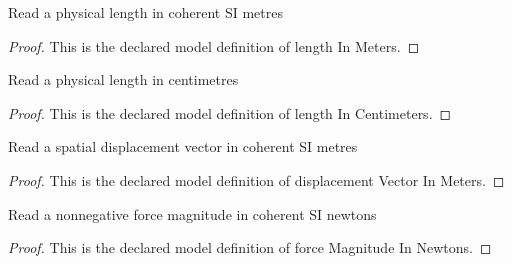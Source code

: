 \begin{definition}
  \label{def:physics:phyx-mini-0701:phyxminiproblems-problemphyxmini0701-lengthinmeters}
  Read a physical length in coherent SI metres
\end{definition}
\begin{proof}
  This is the declared model definition of length In Meters.
\end{proof}
\begin{definition}
  \label{def:physics:phyx-mini-0701:phyxminiproblems-problemphyxmini0701-lengthincentimeters}
  Read a physical length in centimetres
\end{definition}
\begin{proof}
  This is the declared model definition of length In Centimeters.
\end{proof}
\begin{definition}
  \label{def:physics:phyx-mini-0701:phyxminiproblems-problemphyxmini0701-displacementvectorinmeters}
  Read a spatial displacement vector in coherent SI metres
\end{definition}
\begin{proof}
  This is the declared model definition of displacement Vector In Meters.
\end{proof}
\begin{definition}
  \label{def:physics:phyx-mini-0701:phyxminiproblems-problemphyxmini0701-forcemagnitudeinnewtons}
  Read a nonnegative force magnitude in coherent SI newtons
\end{definition}
\begin{proof}
  This is the declared model definition of force Magnitude In Newtons.
\end{proof}

